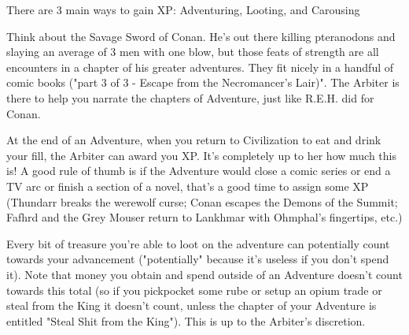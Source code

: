 {There are 3 main ways to gain XP: Adventuring, Looting, and Carousing



Think about the Savage Sword of Conan.  He's out there killing pteranodons and slaying an average of 3 men with one blow, but those feats of strength are all encounters in a chapter of his greater adventures.  They fit nicely in a handful of comic books ("part 3 of 3 - Escape from the Necromancer's Lair)".  The Arbiter is there to help you narrate the chapters of Adventure, just like R.E.H. did for Conan.

At the end of an Adventure, when you return to Civilization to eat and drink your fill, the Arbiter can award you XP.  It's completely up to her how much this is!  A good rule of thumb is if the Adventure would close a comic series or end a TV arc or finish a section of a novel, that's a good time to assign some XP (Thundarr breaks the werewolf curse; Conan escapes the Demons of the Summit; Fafhrd and the Grey Mouser return to Lankhmar with Ohmphal's fingertips, etc.)



Every bit of treasure you're able to loot on the adventure can potentially count towards your advancement ("potentially" because it's useless if you don't spend it).  Note that money you obtain and spend outside of an Adventure doesn't count towards this total (so if you pickpocket some rube or setup an opium trade or steal from the King it doesn't count, unless the chapter of your Adventure is entitled "Steal Shit from the King").  This is up to the Arbiter's discretion.

}

